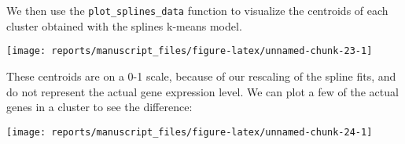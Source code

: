 \documentclass[9pt,a4paper,]{extarticle}
\newenvironment{Shaded}{\begin{snugshade}}{\end{snugshade}}
\newcommand{\DataTypeTok}[1]{\textcolor[rgb]{0.13,0.29,0.53}{#1}}
\newcommand{\DecValTok}[1]{\textcolor[rgb]{0.00,0.00,0.81}{#1}}
\newcommand{\FloatTok}[1]{\textcolor[rgb]{0.00,0.00,0.81}{#1}}
\newcommand{\KeywordTok}[1]{\textcolor[rgb]{0.13,0.29,0.53}{\textbf{#1}}}
\newcommand{\NormalTok}[1]{#1}
\newcommand{\OperatorTok}[1]{\textcolor[rgb]{0.81,0.36,0.00}{\textbf{#1}}}
\newcommand{\OtherTok}[1]{\textcolor[rgb]{0.56,0.35,0.01}{#1}}
\newcommand{\StringTok}[1]{\textcolor[rgb]{0.31,0.60,0.02}{#1}}
\begin{document}
We then use the \texttt{plot\_splines\_data} function to visualize the centroids of
each cluster obtained with the splines k-means model.

\begin{Shaded}
\end{Shaded}

\begin{center}\texttt{[image: reports/manuscript\_files/figure-latex/unnamed-chunk-23-1]} \end{center}

These centroids are on a 0-1 scale, because of our rescaling of the spline
fits, and do not represent the actual gene expression level. We can plot a few
of the actual genes in a cluster to see the difference:

\begin{Shaded}
\end{Shaded}

\begin{center}\texttt{[image: reports/manuscript\_files/figure-latex/unnamed-chunk-24-1]} \end{center}
\end{document}
